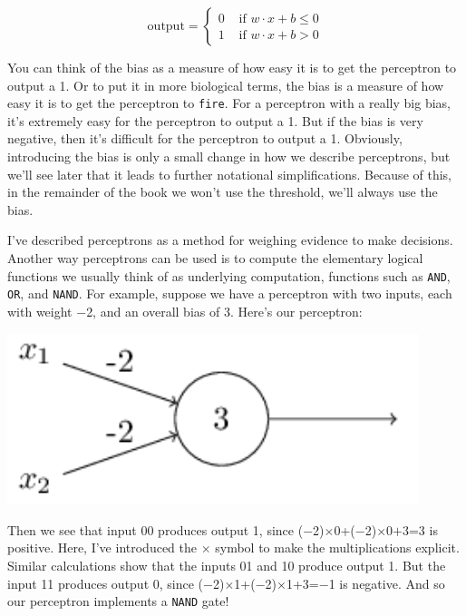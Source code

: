 \begin{equation}
\textrm{output}
=\left\{\begin{array}{ll}{0} & {\textrm { if } w \cdot x+b \leq 0} \\ {1} & {\textrm { if } w \cdot x+b>0}\end{array}\right.
\end{equation}


You can think of the bias as a measure of how easy it is to get the perceptron to output a 1. Or to put it in more biological terms, the bias is a measure of how easy it is to get the perceptron to \lstinline{fire}. For a perceptron with a really big bias, it's extremely easy for the perceptron to output a 1. But if the bias is very negative, then it's difficult for the perceptron to output a 1. Obviously, introducing the bias is only a small change in how we describe perceptrons, but we'll see later that it leads to further notational simplifications. Because of this, in the remainder of the book we won't use the threshold, we'll always use the bias.

I've described perceptrons as a method for weighing evidence to make decisions. Another way perceptrons can be used is to compute the elementary logical functions we usually think of as underlying computation, functions such as \lstinline{AND}, \lstinline{OR}, and \lstinline{NAND}. For example, suppose we have a perceptron with two inputs, each with weight $-$2, and an overall bias of 3. Here's our perceptron: 

{\centering
\includegraphics[width=0.9\textwidth,]{pic/simpleperceptron01}
\par}

Then we see that input 00 produces output 1, since ($-$2)$\times$0+($-$2)$\times$0$+$3=3 is positive. Here, I've introduced the $\times$ symbol to make the multiplications explicit. Similar calculations show that the inputs 01 and 10 produce output 1. But the input 11 produces output 0, since ($-$2)$\times$1+($-$2)$\times$1+3=$-$1 is negative. And so our perceptron implements a \lstinline{NAND} gate!

